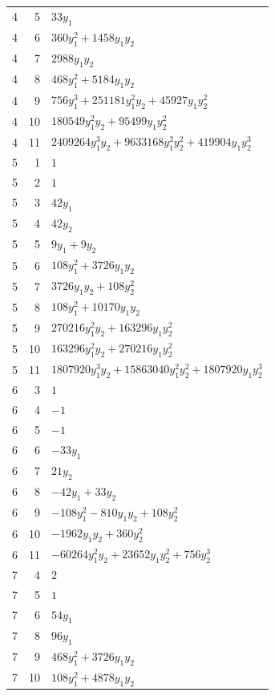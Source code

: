 \documentclass[10pt,a4paper]{article}
\begin{document}
{\begin{longtable}{rrp{125mm}}
4 & 5 & $33 y_{1}$\\
4 & 6 & $360 y_{1}^{2} + 1458 y_{1} y_{2}$\\
4 & 7 & $2988 y_{1} y_{2}$\\
4 & 8 & $468 y_{1}^{2} + 5184 y_{1} y_{2}$\\
4 & 9 & $756 y_{1}^{3} + 251181 y_{1}^{2} y_{2} + 45927 y_{1} y_{2}^{2}$\\
4 & 10 & $180549 y_{1}^{2} y_{2} + 95499 y_{1} y_{2}^{2}$\\
4 & 11 & $2409264 y_{1}^{3} y_{2} + 9633168 y_{1}^{2} y_{2}^{2} + 419904 y_{1} y_{2}^{3}$\\
5 & 1 & $1$\\
5 & 2 & $1$\\
5 & 3 & $42 y_{1}$\\
5 & 4 & $42 y_{2}$\\
5 & 5 & $9 y_{1} + 9 y_{2}$\\
5 & 6 & $108 y_{1}^{2} + 3726 y_{1} y_{2}$\\
5 & 7 & $3726 y_{1} y_{2} + 108 y_{2}^{2}$\\
5 & 8 & $108 y_{1}^{2} + 10170 y_{1} y_{2}$\\
5 & 9 & $270216 y_{1}^{2} y_{2} + 163296 y_{1} y_{2}^{2}$\\
5 & 10 & $163296 y_{1}^{2} y_{2} + 270216 y_{1} y_{2}^{2}$\\
5 & 11 & $1807920 y_{1}^{3} y_{2} + 15863040 y_{1}^{2} y_{2}^{2} + 1807920 y_{1} y_{2}^{3}$\\
6 & 3 & $1$\\
6 & 4 & $-1$\\
6 & 5 & $-1$\\
6 & 6 & $- 33 y_{1}$\\
6 & 7 & $21 y_{2}$\\
6 & 8 & $- 42 y_{1} + 33 y_{2}$\\
6 & 9 & $- 108 y_{1}^{2} - 810 y_{1} y_{2} + 108 y_{2}^{2}$\\
6 & 10 & $- 1962 y_{1} y_{2} + 360 y_{2}^{2}$\\
6 & 11 & $- 60264 y_{1}^{2} y_{2} + 23652 y_{1} y_{2}^{2} + 756 y_{2}^{3}$\\
7 & 4 & $2$\\
7 & 5 & $1$\\
7 & 6 & $54 y_{1}$\\
7 & 8 & $96 y_{1}$\\
7 & 9 & $468 y_{1}^{2} + 3726 y_{1} y_{2}$\\
7 & 10 & $108 y_{1}^{2} + 4878 y_{1} y_{2}$\\

\end{longtable}}
\end{document}
